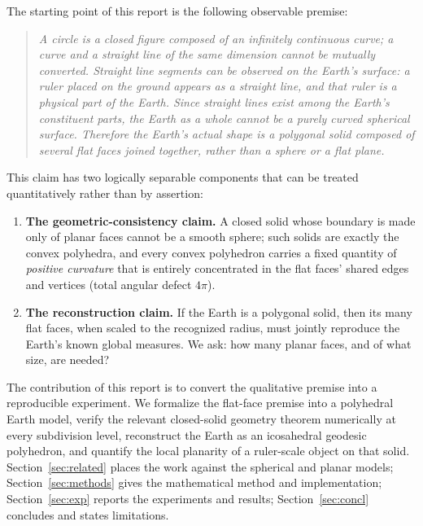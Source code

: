 \documentclass[11pt,a4paper]{article}
\begin{document}
The starting point of this report is the following observable premise:

\begin{quote}
\emph{A circle is a closed figure composed of an infinitely continuous curve; a curve and a straight line of the same dimension cannot be mutually converted. Straight line segments can be observed on the Earth's surface: a ruler placed on the ground appears as a straight line, and that ruler is a physical part of the Earth. Since straight lines exist among the Earth's constituent parts, the Earth as a whole cannot be a purely curved spherical surface. Therefore the Earth's actual shape is a polygonal solid composed of several flat faces joined together, rather than a sphere or a flat plane.}
\end{quote}

This claim has two logically separable components that can be treated quantitatively rather than by assertion:

\begin{enumerate}[label=(\arabic*)]
  \item \textbf{The geometric-consistency claim.} A closed solid whose boundary is made only of planar faces cannot be a smooth sphere; such solids are exactly the convex polyhedra, and every convex polyhedron carries a fixed quantity of \emph{positive curvature} that is entirely concentrated in the flat faces' shared edges and vertices (total angular defect $4\pi$).
  \item \textbf{The reconstruction claim.} If the Earth is a polygonal solid, then its many flat faces, when scaled to the recognized radius, must jointly reproduce the Earth's known global measures. We ask: how many planar faces, and of what size, are needed?
\end{enumerate}

The contribution of this report is to convert the qualitative premise into a reproducible experiment. We formalize the flat-face premise into a polyhedral Earth model, verify the relevant closed-solid geometry theorem numerically at every subdivision level, reconstruct the Earth as an icosahedral geodesic polyhedron, and quantify the local planarity of a ruler-scale object on that solid. Section~\ref{sec:related} places the work against the spherical and planar models; Section~\ref{sec:methods} gives the mathematical method and implementation; Section~\ref{sec:exp} reports the experiments and results; Section~\ref{sec:concl} concludes and states limitations.
\end{document}
